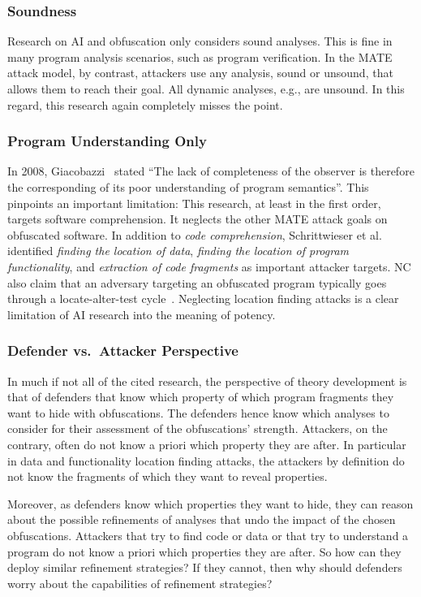 \subsubsection{Soundness}
Research on AI and obfuscation only considers sound analyses. This is fine in many program analysis scenarios, such as program verification. In the MATE attack model, by contrast, attackers use any analysis, sound or unsound, that allows them to reach their goal. All dynamic analyses, e.g., are unsound. In this regard, this research again completely misses the point. 

\subsubsection{Program Understanding Only}
In 2008, Giacobazzi~\cite{2008hiding} stated ``The lack of completeness of the observer is therefore the corresponding of its poor understanding of program semantics''. This pinpoints an important limitation: This research, at least in the first order, targets software comprehension. It neglects the other MATE attack goals on obfuscated software. In addition to \emph{code comprehension}, Schrittwieser et al.~\cite{survey2016} identified \emph{finding the location of data}, \emph{finding the location of program functionality}, and \emph{extraction of code fragments} as important attacker targets. NC also claim that an adversary targeting an obfuscated program typically goes through a locate-alter-test cycle~\cite{collbergbook}. Neglecting location finding attacks is a clear limitation of AI research into the meaning of potency.

\subsubsection{Defender vs.\ Attacker Perspective}
\label{sec:perspective}
In much if not all of the cited research, the perspective of theory development is that of defenders that know which property of which program fragments they want to hide with obfuscations. The defenders hence know which analyses to consider for their assessment of the obfuscations' strength. Attackers, on the contrary, often do not know a priori which property they are after. In particular in data and functionality location finding attacks, the attackers by definition do not know the fragments of which they want to reveal properties.

Moreover, as defenders know which properties they want to hide, they can reason about the possible refinements of analyses that undo the impact of the chosen obfuscations. Attackers that try to find code or data or that try to understand a program do not know a priori which properties they are after. So how can they deploy similar refinement strategies? If they cannot, then why should defenders worry about the capabilities of refinement strategies? 

